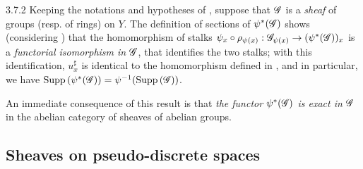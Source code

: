 \begin{env}{3.7.2}
\label{env-0.3.7.2}
Keeping the notations and hypotheses of , suppose that $\mathscr{G}$ is a
\emph{sheaf} of groups (resp. of rings) on $Y$. The definition of sections of
$\psi^*(\mathscr{G})$  shows (considering ) that the
homomorphism of stalks $\psi_x\circ\rho_{\psi(x)}:\mathscr{G}_{\psi(x)}\to(\psi^*(\mathscr{G}))_x$
is a \emph{functorial isomorphism in $\mathscr{G}$}, that identifies the two stalks; with this
identification, $u_x^\sharp$ is identical to the homomorphism defined in ,
and in particular, we have ${\mathop{\mathrm{Supp}}\nolimits}\,(\psi^*(\mathscr{G}))=\psi^{-1}({\mathop{\mathrm{Supp}}\nolimits}\,(\mathscr{G}))$.

An immediate consequence of this result is that \emph{the functor $\psi^*(\mathscr{G})$ is exact
in $\mathscr{G}$} in the abelian category of sheaves of abelian groups.
\end{env}

\subsection{Sheaves on pseudo-discrete spaces}
\label{0-prelim-3.8}


